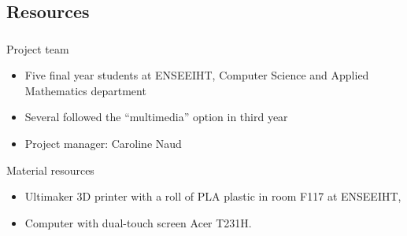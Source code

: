 \documentclass{beamer}
\begin{document}
\subsection{Resources}
\begin{frame}
	\frametitle{}
	
	\begin{block}{Project team}
		\begin{itemize}
		\item Five final year students at ENSEEIHT, Computer Science and Applied Mathematics department
		\item Several followed the “multimedia” option in third year
		\item Project manager: Caroline Naud
		\end{itemize}
    \end{block}
    
    \begin{block}{Material resources}
    	\begin{itemize}
    	\item Ultimaker 3D printer with a roll of PLA plastic in room F117 at ENSEEIHT,
    	\item Computer with dual-touch screen Acer T231H.
		\end{itemize}
    \end{block}
      
\end{frame}
\end{document}
